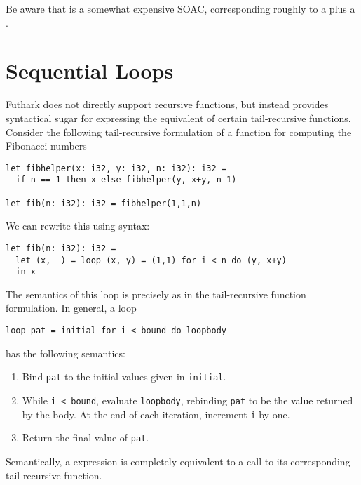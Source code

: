 \documentclass[oneside,11pt]{book}
\begin{document}


\noindent
Be aware that  is a somewhat expensive SOAC,
corresponding roughly to a  plus a .

\section{Sequential Loops}
\label{sec:sequential-loops}

Futhark does not directly support recursive functions, but instead
provides syntactical sugar for expressing the equivalent of certain
tail-recursive functions.  Consider the following tail-recursive
formulation of a function for computing the Fibonacci numbers

\begin{lstlisting}
let fibhelper(x: i32, y: i32, n: i32): i32 =
  if n == 1 then x else fibhelper(y, x+y, n-1)

let fib(n: i32): i32 = fibhelper(1,1,n)
\end{lstlisting}

We can rewrite this using  syntax:

\begin{lstlisting}
let fib(n: i32): i32 =
  let (x, _) = loop (x, y) = (1,1) for i < n do (y, x+y)
  in x
\end{lstlisting}

The semantics of this loop is precisely as in the tail-recursive function
formulation.  In general, a loop

\begin{lstlisting}
loop pat = initial for i < bound do loopbody
\end{lstlisting}

\noindent
has the following semantics:

\begin{enumerate}
\item Bind \texttt{pat} to the initial values given in
  \texttt{initial}.
\item While \texttt{i < bound}, evaluate \texttt{loopbody}, rebinding
  \texttt{pat} to be the value returned by the body.  At the end of
  each iteration, increment \texttt{i} by one.
\item Return the final value of \texttt{pat}.
\end{enumerate}

Semantically, a  expression is completely equivalent to a
call to its corresponding tail-recursive function.
\end{document}
